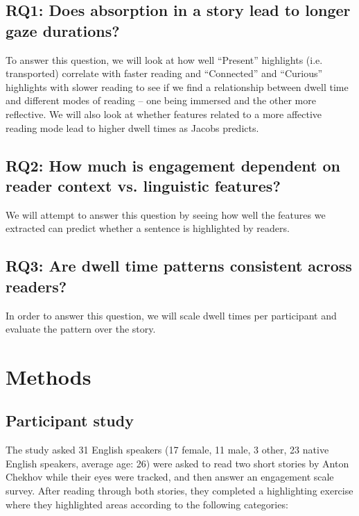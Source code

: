 \documentclass[11pt]{article}
\begin{document}
\subsection{RQ1: Does absorption in a story lead to longer gaze durations?}
\label{subsection:rq1}

To answer this question, we will look at how well “Present” highlights (i.e. transported) correlate with faster reading and “Connected” and “Curious” highlights with slower reading to see if we find a relationship between dwell time and different modes of reading -- one being immersed and the other more reflective. We will also look at whether features related to a more affective reading mode lead to higher dwell times as Jacobs predicts.

\subsection{RQ2: How much is engagement dependent on reader context vs. linguistic features?}
\label{subsection:rq2}

We will attempt to answer this question by seeing how well the features we extracted can predict whether a sentence is highlighted by readers.

\subsection{RQ3: Are dwell time patterns consistent across readers?}
\label{subsection:rq3}

In order to answer this question, we will scale dwell times per participant and evaluate the pattern over the story.

\section{Methods}

\subsection{Participant study}

The study asked 31 English speakers (17 female, 11 male, 3 other, 23 native English speakers, average age: 26) were asked to read two short stories by Anton Chekhov while their eyes were tracked, and then answer an engagement scale survey. After reading through both stories, they completed a highlighting exercise where they highlighted areas according to the following categories:
\end{document}
